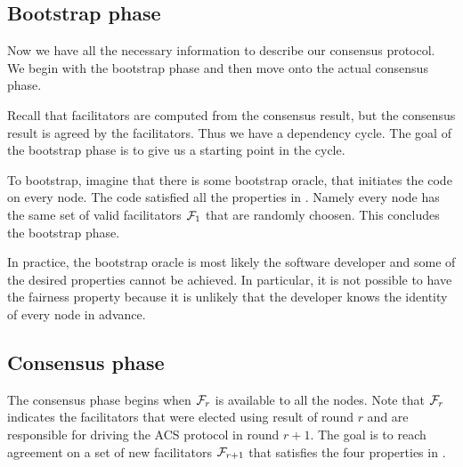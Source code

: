 


\subsection{Bootstrap phase}
\label{sec:bootstrap}
Now we have all the necessary information to describe our consensus protocol.
We begin with the bootstrap phase and then move onto the actual consensus phase.

Recall that facilitators are computed from the consensus result,
but the consensus result is agreed by the facilitators.
Thus we have a dependency cycle.
The goal of the bootstrap phase is to give us a starting point in the cycle.

To bootstrap, imagine that there is some bootstrap oracle, that initiates the code on every node.
The code satisfied all the properties in .
Namely every node has the same set of valid facilitators $\mathcal{F}_1$ that are randomly choosen.
This concludes the bootstrap phase.

In practice, the bootstrap oracle is most likely the software developer and some of the desired properties cannot be achieved.
In particular, it is not possible to have the fairness property because it is unlikely that the developer knows the identity of every node in advance.

\subsection{Consensus phase}
\label{sec:consensus-phase}
The consensus phase begins when $\mathcal{F}_r$ is available to all the nodes.
Note that $\mathcal{F}_r$ indicates the facilitators that were elected using result of round $r$ and are responsible for driving the ACS protocol in round $r + 1$.
The goal is to reach agreement on a set of new facilitators $\mathcal{F}_{r + 1}$ that satisfies the four properties in .

